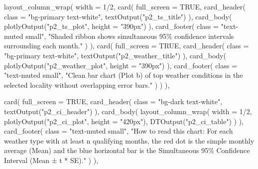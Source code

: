 \documentclass[
  letterpaper,
  DIV=11,
  numbers=noendperiod]{scrartcl}
\newenvironment{Shaded}{\begin{snugshade}}{\end{snugshade}}
\newcommand{\AttributeTok}[1]{\textcolor[rgb]{0.40,0.45,0.13}{#1}}
\newcommand{\ConstantTok}[1]{\textcolor[rgb]{0.56,0.35,0.01}{#1}}
\newcommand{\DecValTok}[1]{\textcolor[rgb]{0.68,0.00,0.00}{#1}}
\newcommand{\FunctionTok}[1]{\textcolor[rgb]{0.28,0.35,0.67}{#1}}
\newcommand{\NormalTok}[1]{\textcolor[rgb]{0.00,0.23,0.31}{#1}}
\newcommand{\SpecialCharTok}[1]{\textcolor[rgb]{0.37,0.37,0.37}{#1}}
\newcommand{\StringTok}[1]{\textcolor[rgb]{0.13,0.47,0.30}{#1}}
\begin{document}
\begin{Shaded}
\begin{Highlighting}[]
      \FunctionTok{layout\_column\_wrap}\NormalTok{(}
        \AttributeTok{width =} \DecValTok{1}\SpecialCharTok{/}\DecValTok{2}\NormalTok{,}
        \FunctionTok{card}\NormalTok{(}
          \AttributeTok{full\_screen =} \ConstantTok{TRUE}\NormalTok{,}
          \FunctionTok{card\_header}\NormalTok{(}
            \AttributeTok{class =} \StringTok{"bg{-}primary text{-}white"}\NormalTok{,}
            \FunctionTok{textOutput}\NormalTok{(}\StringTok{"p2\_ts\_title"}\NormalTok{)}
\NormalTok{          ),}
          \FunctionTok{card\_body}\NormalTok{(}
            \FunctionTok{plotlyOutput}\NormalTok{(}\StringTok{"p2\_ts\_plot"}\NormalTok{, }\AttributeTok{height =} \StringTok{"390px"}\NormalTok{)}
\NormalTok{          ),}
          \FunctionTok{card\_footer}\NormalTok{(}
            \AttributeTok{class =} \StringTok{"text{-}muted small"}\NormalTok{,}
            \StringTok{"Shaded ribbon shows simultaneous 95\% confidence intervals surrounding each month."}
\NormalTok{          )}
\NormalTok{        ),}
        \FunctionTok{card}\NormalTok{(}
          \AttributeTok{full\_screen =} \ConstantTok{TRUE}\NormalTok{,}
          \FunctionTok{card\_header}\NormalTok{(}
            \AttributeTok{class =} \StringTok{"bg{-}primary text{-}white"}\NormalTok{,}
            \FunctionTok{textOutput}\NormalTok{(}\StringTok{"p2\_weather\_title"}\NormalTok{)}
\NormalTok{          ),}
          \FunctionTok{card\_body}\NormalTok{(}
            \FunctionTok{plotlyOutput}\NormalTok{(}\StringTok{"p2\_weather\_plot"}\NormalTok{, }\AttributeTok{height =} \StringTok{"390px"}\NormalTok{)}
\NormalTok{          ),}
          \FunctionTok{card\_footer}\NormalTok{(}
            \AttributeTok{class =} \StringTok{"text{-}muted small"}\NormalTok{,}
            \StringTok{"Clean bar chart (Plot \textquotesingle{}b\textquotesingle{}) of top weather conditions in the selected locality without overlapping error bars."}
\NormalTok{          )}
\NormalTok{        )}
\NormalTok{      ),}

      \FunctionTok{card}\NormalTok{(}
        \AttributeTok{full\_screen =} \ConstantTok{TRUE}\NormalTok{,}
        \FunctionTok{card\_header}\NormalTok{(}
          \AttributeTok{class =} \StringTok{"bg{-}dark text{-}white"}\NormalTok{,}
          \FunctionTok{textOutput}\NormalTok{(}\StringTok{"p2\_ci\_header"}\NormalTok{)}
\NormalTok{        ),}
        \FunctionTok{card\_body}\NormalTok{(}
          \FunctionTok{layout\_column\_wrap}\NormalTok{(}
            \AttributeTok{width =} \DecValTok{1}\SpecialCharTok{/}\DecValTok{2}\NormalTok{,}
            \FunctionTok{plotlyOutput}\NormalTok{(}\StringTok{"p2\_ci\_plot"}\NormalTok{, }\AttributeTok{height =} \StringTok{"420px"}\NormalTok{),}
            \FunctionTok{DTOutput}\NormalTok{(}\StringTok{"p2\_ci\_table"}\NormalTok{)}
\NormalTok{          )}
\NormalTok{        ),}
        \FunctionTok{card\_footer}\NormalTok{(}
          \AttributeTok{class =} \StringTok{"text{-}muted small"}\NormalTok{,}
          \StringTok{"How to read this chart: For each weather type with at least n qualifying months, the red dot is the simple monthly average (Mean) and the blue horizontal bar is the Simultaneous 95\% Confidence Interval (Mean ± t * SE)."}
\NormalTok{        )}
\NormalTok{      ),}


\end{Highlighting}
\end{Shaded}
\end{document}

